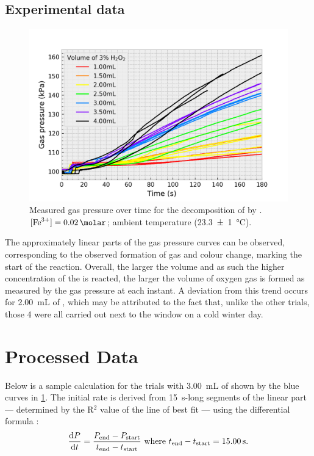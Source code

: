 \documentclass[a4paper, 12pt]{article}
\begin{document}
\subsection*{Experimental data}
\begin{figure}[H]
    \centering
    \includegraphics[width=\textwidth]{data/raw_data}
    \caption{Measured gas pressure over time for the decomposition of  by . $[\ce{Fe^{3+}}] = \SI{0.02}{\molar}$; ambient temperature (\SI{23.3(10)}{\celsius}). }
    \label{fig:raw-data}
\end{figure}

The approximately linear parts of the gas pressure curves can be observed, corresponding to the observed formation of gas and colour change, marking the start of the reaction. Overall, the larger the volume and as such the higher concentration of the  is reacted, the larger the volume of oxygen gas is formed as measured by the gas pressure at each instant. A deviation from this trend occurs for \SI{2.00}{\mL} of , which may be attributed to the fact that, unlike the other trials, those 4 were all carried out next to the window on a cold winter day.

\section*{Processed Data}
Below is a sample calculation for the trials with \SI{3.00}{\mL} of  shown by the blue curves in \cref{fig:raw-data}. The initial rate is derived from \SI{15}{\s}-long segments of the linear part --- determined by the R$^2$ value of the line of best fit --- using the differential formula \autocite{numerical_method}:
\[ 
    \dv{P}{t} 
    = \dfrac{ P_{ \text{end} } - P_{ \text{start} } }{ t_{ \text{end} } - t_{ \text{start} } }
    \text{ where } t_{ \text{end} } - t_{ \text{start} } = \SI{15.00}{\s}. 
\]
\end{document}
